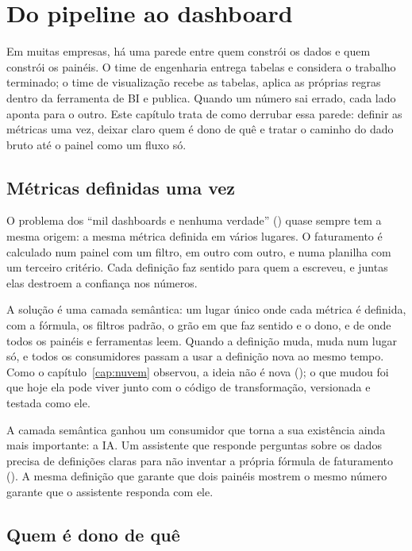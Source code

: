\chapter{Do pipeline ao dashboard}
\label{cap:pipeline-dashboard}

Em muitas empresas, há uma parede entre quem constrói os dados e quem constrói os painéis. O
time de engenharia entrega tabelas e considera o trabalho terminado; o time de visualização
recebe as tabelas, aplica as próprias regras dentro da ferramenta de BI e publica. Quando um
número sai errado, cada lado aponta para o outro. Este capítulo trata de como derrubar essa
parede: definir as métricas uma vez, deixar claro quem é dono de quê e tratar o caminho do
dado bruto até o painel como um fluxo só.

\section{Métricas definidas uma vez}
\label{sec:camada-semantica}

O problema dos \enquote{mil dashboards e nenhuma verdade} () quase
sempre tem a mesma origem: a mesma métrica definida em vários lugares. O faturamento é
calculado num painel com um filtro, em outro com outro, e numa planilha com um terceiro
critério. Cada definição faz sentido para quem a escreveu, e juntas elas destroem a confiança
nos números.

A solução é uma camada semântica: um lugar único onde cada métrica é definida, com a fórmula,
os filtros padrão, o grão em que faz sentido e o dono, e de onde todos os painéis e
ferramentas leem. Quando a definição muda, muda num lugar só, e todos os consumidores passam a
usar a definição nova ao mesmo tempo. Como o capítulo~\ref{cap:nuvem} observou, a ideia não é
nova (); o que mudou foi que hoje ela pode viver junto com o código de
transformação, versionada e testada como ele.

A camada semântica ganhou um consumidor que torna a sua existência ainda mais importante: a
IA. Um assistente que responde perguntas sobre os dados precisa de definições claras para não
inventar a própria fórmula de faturamento (). A mesma definição
que garante que dois painéis mostrem o mesmo número garante que o assistente responda com
ele.

\section{Quem é dono de quê}
\label{sec:donos}

